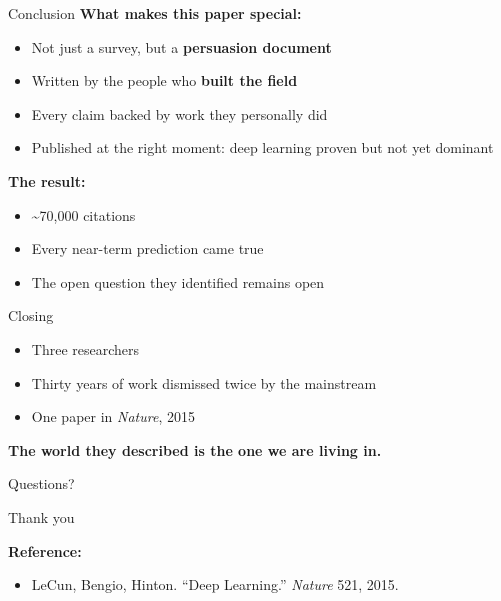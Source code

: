 \begin{frame}{Conclusion}
    \textbf{What makes this paper special:}
    
    \vspace{1em}
    \begin{itemize}
        \item Not just a survey, but a \textbf{persuasion document}
        \item Written by the people who \textbf{built the field}
        \item Every claim backed by work they personally did
        \item Published at the right moment: deep learning proven but not yet dominant
    \end{itemize}
    
    \vspace{1em}
    \textbf{The result:}
    \begin{itemize}
        \item \textasciitilde70,000 citations
        \item Every near-term prediction came true
        \item The open question they identified remains open
    \end{itemize}
\end{frame}

\begin{frame}{Closing}
    \begin{itemize}
        \item Three researchers
        \item Thirty years of work dismissed twice by the mainstream
        \item One paper in \textit{Nature}, 2015
    \end{itemize}
    
    \vspace{1em}
    \textbf{The world they described is the one we are living in.}
\end{frame}

\begin{frame}{Questions?}
    \vspace{2em}
    \begin{center}
        \Large
        Thank you
    \end{center}
    
    \vspace{2em}
    \textbf{Reference:}
    \begin{itemize}
        \item LeCun, Bengio, Hinton. ``Deep Learning.'' \textit{Nature} 521, 2015.
    \end{itemize}
\end{frame}

